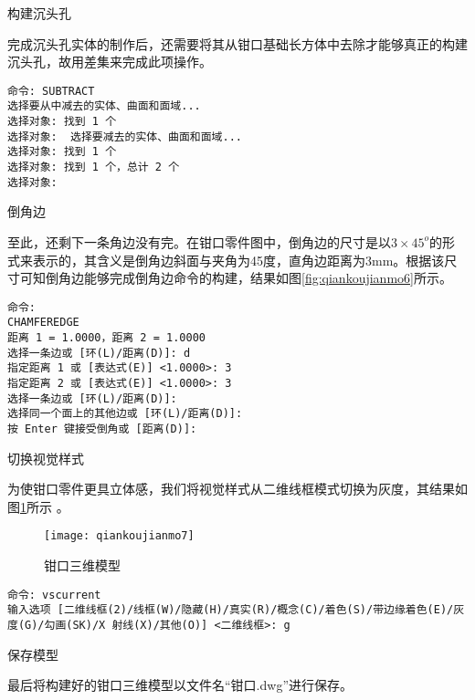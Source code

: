 \begin{procedure}
\begin{figure}[htbp]
\centering
\begin{floatrow}[2]
\end{floatrow}
\end{figure}

\item 构建沉头孔

完成沉头孔实体的制作后，还需要将其从钳口基础长方体中去除才能够真正的构建沉头孔，故用差集来完成此项操作。
\begin{lstlisting}
命令: SUBTRACT
选择要从中减去的实体、曲面和面域...
选择对象: 找到 1 个
选择对象:  选择要减去的实体、曲面和面域...
选择对象: 找到 1 个
选择对象: 找到 1 个，总计 2 个
选择对象:
\end{lstlisting}

\item 倒角边

至此，还剩下一条角边没有完。在钳口零件图中，倒角边的尺寸是以$3\times 45^o$的形式来表示的，其含义是倒角边斜面与夹角为45度，直角边距离为3mm。根据该尺寸可知倒角边能够完成倒角边命令的构建，结果如图\ref{fig:qiankoujianmo6}所示。

\begin{lstlisting}
命令:
CHAMFEREDGE
距离 1 = 1.0000，距离 2 = 1.0000
选择一条边或 [环(L)/距离(D)]: d
指定距离 1 或 [表达式(E)] <1.0000>: 3
指定距离 2 或 [表达式(E)] <1.0000>: 3
选择一条边或 [环(L)/距离(D)]:
选择同一个面上的其他边或 [环(L)/距离(D)]:
按 Enter 键接受倒角或 [距离(D)]:
\end{lstlisting}

\item 切换视觉样式

为使钳口零件更具立体感，我们将视觉样式从二维线框模式切换为灰度，其结果如图\ref{fig:qiankoujianmo7}所示 。


\begin{figure}[htbp]
\centering
\texttt{[image: qiankoujianmo7]}
\caption{钳口三维模型}\label{fig:qiankoujianmo7}
\end{figure}
\begin{lstlisting}
命令: vscurrent
输入选项 [二维线框(2)/线框(W)/隐藏(H)/真实(R)/概念(C)/着色(S)/带边缘着色(E)/灰度(G)/勾画(SK)/X 射线(X)/其他(O)] <二维线框>: g
\end{lstlisting}

\item 保存模型

最后将构建好的钳口三维模型以文件名“钳口.dwg”进行保存。
\end{procedure}
\endinput